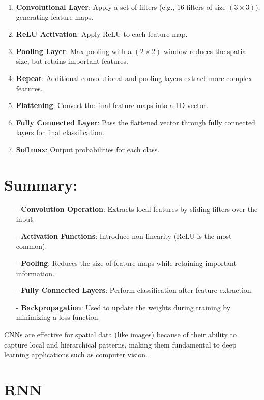 \documentclass[10pt]{article}
\begin{document}
\begin{enumerate}
   \item {\bf Convolutional Layer}: Apply a set of filters (e.g., 16 filters of size $( 3 \times 3 )$), generating feature maps.
   \item {\bf ReLU Activation}: Apply ReLU to each feature map.
   \item {\bf Pooling Layer}: Max pooling with a $( 2 \times 2 )$ window reduces the spatial size, but retains important features.
   \item {\bf Repeat}: Additional convolutional and pooling layers extract more complex features.
   \item {\bf Flattening}: Convert the final feature maps into a 1D vector.
   \item {\bf Fully Connected Layer}: Pass the flattened vector through fully connected layers for final classification.
   \item {\bf Softmax}: Output probabilities for each class.
\end{enumerate}

\section{ Summary:}

\begin{itemize}
   \item [-] {\bf Convolution Operation}: Extracts local features by sliding filters over the input.
   \item [-] {\bf Activation Functions}: Introduce non-linearity (ReLU is the most common).
   \item [-] {\bf Pooling}: Reduces the size of feature maps while retaining important information.
   \item [-] {\bf Fully Connected Layers}: Perform classification after feature extraction.
   \item [-] {\bf Backpropagation}: Used to update the weights during training by minimizing a loss function.
\end{itemize}

CNNs are effective for spatial data (like images) because of their ability to capture local and hierarchical patterns, making them fundamental to deep learning applications such as computer vision.


\section {RNN}
\end{document}

